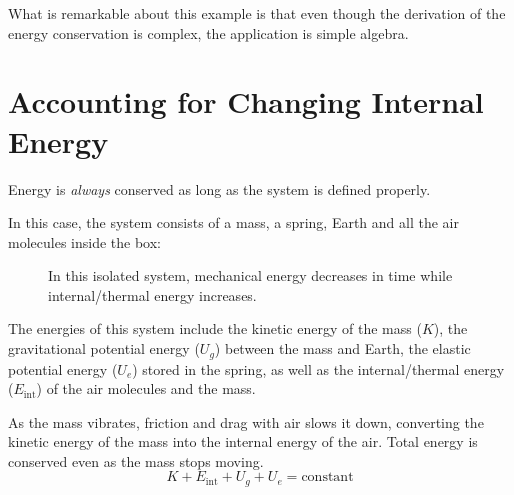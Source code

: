 \begin{example}
  What is remarkable about this example is that even though the derivation
  of the energy conservation is complex, the application is simple algebra.
\end{example}


\section{Accounting for Changing Internal Energy}
Energy is \emph{always} conserved as long as the system is defined properly.

In this case, the system consists of a mass, a spring, Earth and all the air
molecules inside the box:
\begin{figure}[ht]
  \centering
  \caption{In this isolated system, mechanical energy decreases in time while
    internal/thermal energy increases.}
  \label{fig:isolated-with-thermal}
\end{figure}
The energies of this system include the kinetic energy of the mass ($K$), the
gravitational potential energy ($U_g$) between the mass and Earth, the elastic
potential energy ($U_e$) stored in the spring, as well as the internal/thermal
energy ($E_\text{int}$) of the air molecules and the mass.

As the mass vibrates, friction and drag with air slows it down, converting the
kinetic energy of the mass into the internal energy of the air. Total energy
is conserved even as the mass stops moving.
\begin{equation}
  K + E_\text{int}+U_g+U_e=\text{constant}
\end{equation}



